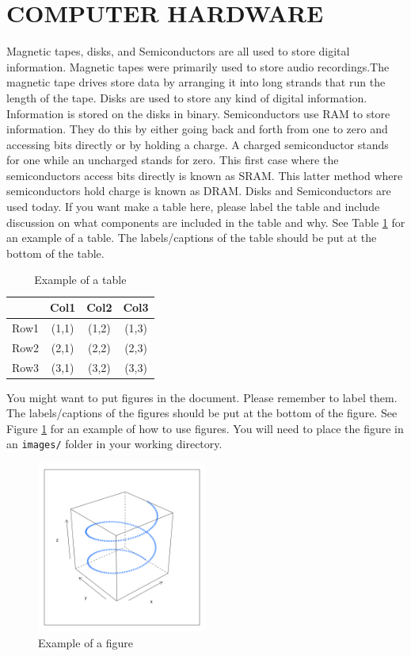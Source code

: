 \documentclass[letterpaper, 10 pt, conference]{IEEEconf}
\begin{document}
\section{COMPUTER HARDWARE}
Magnetic tapes, disks, and Semiconductors are all used to store digital information. Magnetic tapes were primarily used to store audio recordings.The magnetic tape drives store data by arranging it into long strands that run the length of the tape. Disks are used to store any kind of digital information. Information is stored on the disks in binary. Semiconductors use RAM to store information. They do this by either going back and forth from one to zero and accessing bits directly or by holding a charge. A charged semiconductor stands for one while an uncharged stands for zero. This first case where the semiconductors access bits directly is known as SRAM. This latter method where semiconductors hold charge is known as DRAM. Disks and Semiconductors are used today. 
If you want make a table here, please label the table
and include discussion on what components are included in the
table and why. See Table
\ref{tbl:example} for an example of a table.
The labels/captions of the table should be put at the bottom
of the table.


\begin{table}[h!]
\begin{center}
\begin{tabular}{||c | c | c | c||} 
\hline
  & Col1 & Col2 & Col3 \\ [0.5ex]
\hline\hline
Row1 & (1,1) & (1,2) & (1,3) \\ 
\hline
Row2 & (2,1) & (2,2) & (2,3) \\
\hline
Row3 & (3,1) & (3,2) & (3,3) \\
\hline
\end{tabular}
\caption{Example of a table}
\label{tbl:example}
\end{center}
\end{table}

You might want to put figures in the document. Please
remember to label them. The labels/captions of the figures
should be put at the bottom of the figure. See Figure
\ref{fig:example} for an example of how to use figures.
You will need to place the figure in an \texttt{images/} folder
in your working directory.

\begin{figure}[h!]
\centering
\includegraphics[width=0.5\textwidth]{spiral.png}
\caption{Example of a figure}
\label{fig:example}
\end{figure} 
\end{document}
